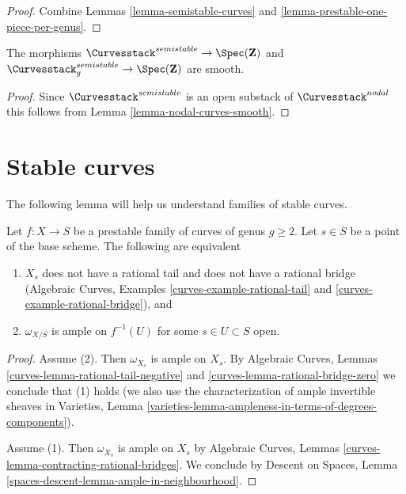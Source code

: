 \begin{proof}
Combine Lemmas \ref{lemma-semistable-curves} and
\ref{lemma-prestable-one-piece-per-genus}.
\end{proof}

\begin{lemma}
\label{lemma-semistable-curves-smooth}
The morphisms
$\Curvesstack^{semistable} \to \Spec(\mathbf{Z})$ and
$\Curvesstack^{semistable}_g \to \Spec(\mathbf{Z})$
are smooth.
\end{lemma}

\begin{proof}
Since $\Curvesstack^{semistable}$ is an open substack of
$\Curvesstack^{nodal}$ this follows from
Lemma \ref{lemma-nodal-curves-smooth}.
\end{proof}







\section{Stable curves}
\label{section-stable-curves}

\noindent
The following lemma will help us understand families of stable curves.

\begin{lemma}
\label{lemma-stable}
Let $f : X \to S$ be a prestable family of curves of genus $g \geq 2$.
Let $s \in S$ be a point of the base scheme.
The following are equivalent
\begin{enumerate}
\item $X_s$ does not have a rational tail and does not have a
rational bridge
(Algebraic Curves, Examples
\ref{curves-example-rational-tail} and
\ref{curves-example-rational-bridge}), and
\item $\omega_{X/S}$ is ample on $f^{-1}(U)$ for some $s \in U \subset S$ open.
\end{enumerate}
\end{lemma}

\begin{proof}
Assume (2). Then $\omega_{X_s}$ is ample on $X_s$.
By Algebraic Curves, Lemmas \ref{curves-lemma-rational-tail-negative} and
\ref{curves-lemma-rational-bridge-zero}
we conclude that (1) holds (we also
use the characterization of ample invertible sheaves
in Varieties, Lemma
\ref{varieties-lemma-ampleness-in-terms-of-degrees-components}).

\medskip\noindent
Assume (1). Then $\omega_{X_s}$ is ample on $X_s$ by
Algebraic Curves, Lemmas \ref{curves-lemma-contracting-rational-bridges}.
We conclude by Descent on Spaces, Lemma
\ref{spaces-descent-lemma-ample-in-neighbourhood}.
\end{proof}

